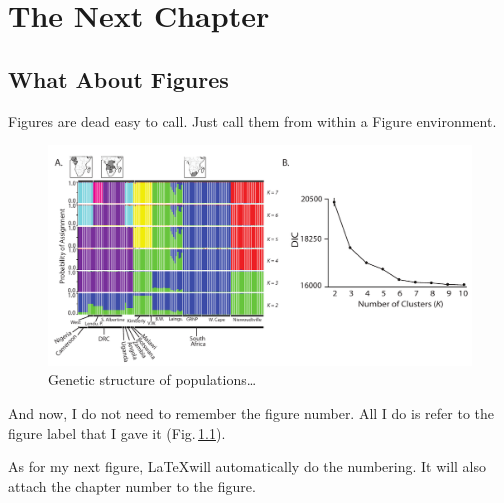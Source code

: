 \chapter{The Next Chapter} 
\label{nextChapt} 



\section{What About Figures}

Figures are dead easy to call. Just call them from within a Figure environment.

\begin{figure}[h] %
	\centering
	\includegraphics[scale=0.6]{Figs/Fig3_TESS_full_round2.pdf}
    \caption[Admixture]{Genetic structure of populations\ldots}
    \label{tess_analysis}
\end{figure}

And now, I do not need to remember the figure number. All I do is refer to the figure label that I gave it (Fig.\,\ref{tess_analysis}).


As for my next figure, \LaTeX will automatically do the numbering. It will also attach the chapter number to the figure.



